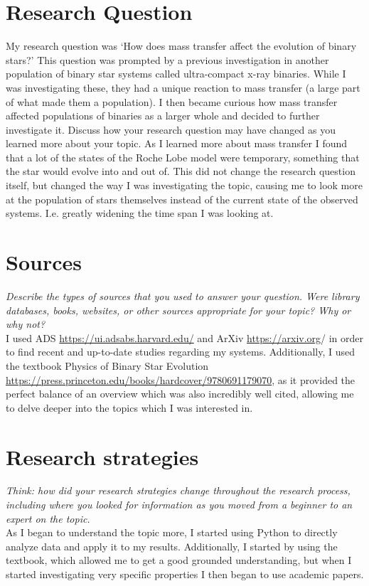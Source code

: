 \documentclass[12pt, a4paper]{article}
\begin{document}
\section{Research Question}
    My research question was `How does mass transfer affect the evolution of binary stars?' This question was prompted by a previous investigation in another population of binary star systems called ultra-compact x-ray binaries. While I was investigating these, they had a unique reaction to mass transfer (a large part of what made them a population). I then became curious how mass transfer affected populations of binaries as a larger whole and decided to further investigate it.
    Discuss how your research question may have changed as you learned more about your topic.
    As I learned more about mass transfer I found that a lot of the states of the Roche Lobe model were temporary, something that the star would evolve into and out of. This did not change the research question itself, but changed the way I was investigating the topic, causing me to look more at the population of stars themselves instead of the current state of the observed systems. I.e. greatly widening the time span I was looking at.
\section{Sources}
    \textit{Describe the types of sources that you used to answer your question.  Were library databases, books, websites, or other sources appropriate for your topic?  Why or why not?}\\
    I used ADS \url{https://ui.adsabs.harvard.edu/} and ArXiv \url{https://arxiv.org}/ in order to find recent and up-to-date studies regarding my systems. Additionally, I used the textbook Physics of Binary Star Evolution \url{https://press.princeton.edu/books/hardcover/9780691179070}, as it provided the perfect balance of an overview which was also incredibly well cited, allowing me to delve deeper into the topics which I was interested in.
\section{Research strategies}
    \textit{Think: how did your research strategies change throughout the research process, including where you looked for information as you moved from a beginner to an expert on the topic.}\\
    As I began to understand the topic more, I started using Python to directly analyze data and apply it to my results. Additionally, I started by using the textbook, which allowed me to get a good grounded understanding, but when I started investigating very specific properties I then began to use academic papers.
\end{document}
